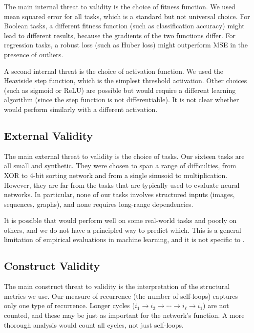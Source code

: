 The main internal threat to validity is the choice of fitness function.
We used mean squared error for all tasks, which is a standard but not
universal choice. For Boolean tasks, a different fitness function (such
as classification accuracy) might lead to different results, because
the gradients of the two functions differ. For regression tasks, a
robust loss (such as Huber loss) might outperform MSE in the presence
of outliers.

A second internal threat is the choice of activation function. We used
the Heaviside step function, which is the simplest threshold activation.
Other choices (such as sigmoid or ReLU) are possible but would require
a different learning algorithm (since the step function is not
differentiable). It is not clear whether \modnet{} would perform
similarly with a different activation.

\subsection{External Validity}
\label{sec:disc-external}

The main external threat to validity is the choice of tasks. Our
sixteen tasks are all small and synthetic. They were chosen to span a
range of difficulties, from XOR to 4-bit sorting network and from a
single sinusoid to multiplication. However, they are far from the tasks
that are typically used to evaluate neural networks. In particular,
none of our tasks involves structured inputs (images, sequences,
graphs), and none requires long-range dependencies.

It is possible that \modnet{} would perform well on some real-world
tasks and poorly on others, and we do not have a principled way to
predict which. This is a general limitation of empirical evaluations
in machine learning, and it is not specific to \modnet{}.

\subsection{Construct Validity}
\label{sec:disc-construct}

The main construct threat to validity is the interpretation of the
structural metrics we use. Our measure of recurrence (the number of
self-loops) captures only one type of recurrence. Longer cycles
($i_1 \to i_2 \to \cdots \to i_\ell \to i_1$) are not counted, and
these may be just as important for the network's function. A more
thorough analysis would count all cycles, not just self-loops.


